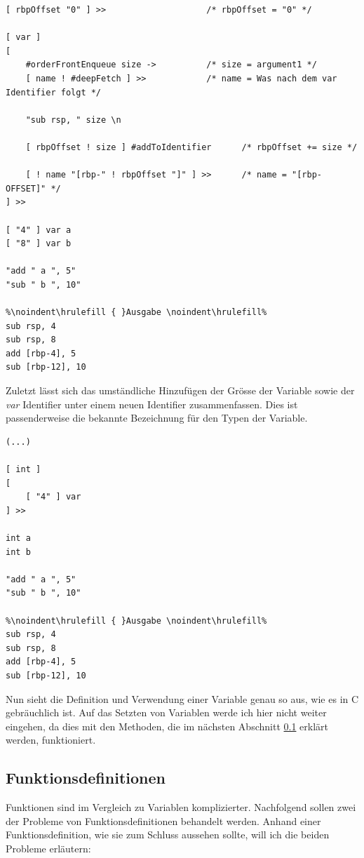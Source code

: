 \begin{minipage}{\linewidth}
\begin{lstlisting}[language=QHS, label=eg:qhs-vardefinition, caption=Definition einer Variable mit rbpOffset]
[ rbpOffset "0" ] >>                    /* rbpOffset = "0" */

[ var ]
[
    #orderFrontEnqueue size ->          /* size = argument1 */
    [ name ! #deepFetch ] >>            /* name = Was nach dem var Identifier folgt */

    "sub rsp, " size \n

    [ rbpOffset ! size ] #addToIdentifier      /* rbpOffset += size */

    [ ! name "[rbp-" ! rbpOffset "]" ] >>      /* name = "[rbp-OFFSET]" */
] >> 

[ "4" ] var a 
[ "8" ] var b 

"add " a ", 5"
"sub " b ", 10"
    
%\noindent\hrulefill { }Ausgabe \noindent\hrulefill%
sub rsp, 4
sub rsp, 8
add [rbp-4], 5
sub [rbp-12], 10
\end{lstlisting}
\end{minipage}

Zuletzt lässt sich das umständliche Hinzufügen der Grösse der Variable sowie der \textit{var} Identifier unter einem neuen Identifier zusammenfassen. Dies ist passenderweise die bekannte Bezeichnung für den Typen der Variable.

\begin{lstlisting}[language=QHS, caption=Definition einer Variable mit \textit{int} Identifier] 
(...)

[ int ] 
[
    [ "4" ] var
] >>
    
int a 
int b 
    
"add " a ", 5"
"sub " b ", 10"
        
%\noindent\hrulefill { }Ausgabe \noindent\hrulefill%
sub rsp, 4
sub rsp, 8
add [rbp-4], 5
sub [rbp-12], 10
\end{lstlisting}

Nun sieht die Definition und Verwendung einer Variable genau so aus, wie es in C gebräuchlich ist.
Auf das Setzten von Variablen werde ich hier nicht weiter eingehen, da dies mit den Methoden, die im nächsten Abschnitt \ref{sec:qhs-funcs} erklärt werden, funktioniert.

\subsection{Funktionsdefinitionen} \label{sec:qhs-funcs}
Funktionen sind im Vergleich zu Variablen komplizierter. Nachfolgend sollen zwei der Probleme von Funktionsdefinitionen behandelt werden.
Anhand einer Funktionsdefinition, wie sie zum Schluss aussehen sollte, will ich die beiden Probleme erläutern:

